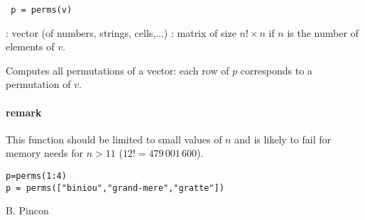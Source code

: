 
\begin{mandesc}
\end{mandesc}

\begin{calling_sequence}
\begin{verbatim}
 p = perms(v)
\end{verbatim}
\end{calling_sequence}

\begin{parameters}
  \begin{varlist}
   : vector (of numbers, strings, cells,...)
   : matrix of size $n! \times n$ if $n$ is the number of
               elements of $v$.
  \end{varlist}
\end{parameters}

\begin{mandescription}
  Computes all permutations of a vector: each row of $p$
  corresponds to a permutation of $v$. 

\paragraph{remark}
This function should be limited to small values of $n$ and is likely
to fail for memory needs for $n > 11$ ($12! = 479\,001\,600$).

\end{mandescription}

\begin{examples}
\begin{Verbatim}
p=perms(1:4)
p = perms(["biniou","grand-mere","gratte"])
\end{Verbatim}
\end{examples}


\begin{manseealso}
\end{manseealso}

\begin{authors}
B. Pincon
\end{authors}

